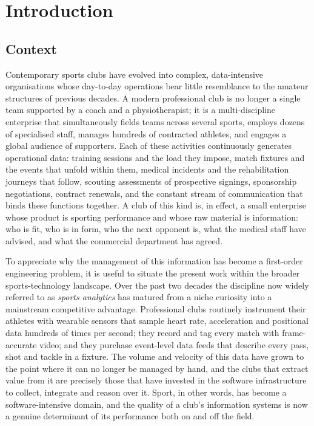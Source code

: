 \chapter{Introduction}
\label{ch:introduction}

\section{Context}
\label{sec:context}

Contemporary sports clubs have evolved into complex, data-intensive organisations whose
day-to-day operations bear little resemblance to the amateur structures of previous
decades. A modern professional club is no longer a single team supported by a coach and a
physiotherapist; it is a multi-discipline enterprise that simultaneously fields teams across
several sports, employs dozens of specialised staff, manages hundreds of contracted
athletes, and engages a global audience of supporters. Each of these activities continuously
generates operational data: training sessions and the load they impose, match fixtures and
the events that unfold within them, medical incidents and the rehabilitation journeys that
follow, scouting assessments of prospective signings, sponsorship negotiations, contract
renewals, and the constant stream of communication that binds these functions together.
A club of this kind is, in effect, a small enterprise whose product is sporting performance
and whose raw material is information: who is fit, who is in form, who the next opponent is,
what the medical staff have advised, and what the commercial department has agreed.

To appreciate why the management of this information has become a first-order engineering
problem, it is useful to situate the present work within the broader sports-technology
landscape. Over the past two decades the discipline now widely referred to as
\emph{sports analytics} has matured from a niche curiosity into a mainstream competitive
advantage. Professional clubs routinely instrument their athletes with wearable sensors that
sample heart rate, acceleration and positional data hundreds of times per second; they
record and tag every match with frame-accurate video; and they purchase event-level data
feeds that describe every pass, shot and tackle in a fixture. The volume and velocity of this
data have grown to the point where it can no longer be managed by hand, and the clubs that
extract value from it are precisely those that have invested in the software infrastructure to
collect, integrate and reason over it. Sport, in other words, has become a software-intensive
domain, and the quality of a club's information systems is now a genuine determinant of its
performance both on and off the field.

